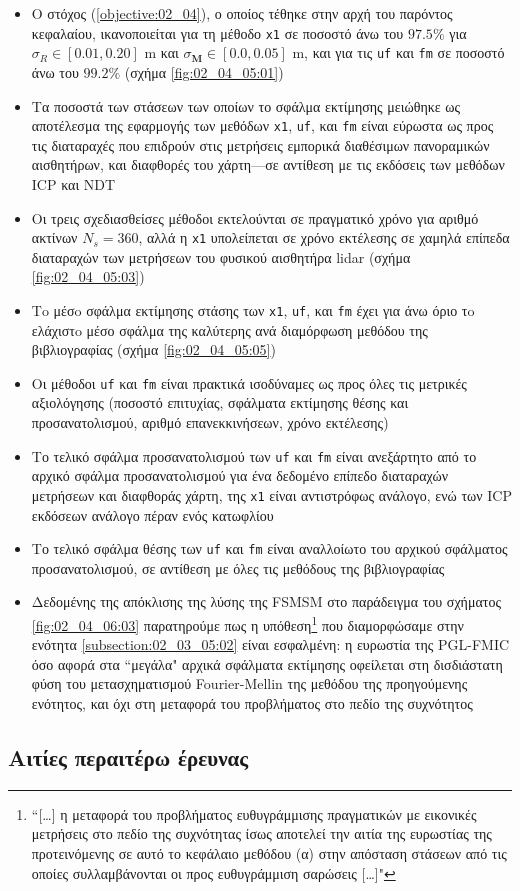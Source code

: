\begin{itemize}
  \item Ο στόχος (\ref{objective:02_04}), ο οποίος τέθηκε στην αρχή του παρόντος
        κεφαλαίου, ικανοποιείται για τη μέθοδο \texttt{x1} σε ποσοστό άνω του
        $97.5\%$ για $\sigma_R \in [0.01, 0.20]$ m και
        $\sigma_{\bm{M}} \in [0.0, 0.05]$ m, και για τις \texttt{uf} και
        \texttt{fm} σε ποσοστό άνω του $99.2\%$ (σχήμα \ref{fig:02_04_05:01})
  \item Τα ποσοστά των στάσεων των οποίων το σφάλμα εκτίμησης μειώθηκε ως
        αποτέλεσμα της εφαρμογής των μεθόδων \texttt{x1}, \texttt{uf}, και
        \texttt{fm} είναι εύρωστα ως προς τις διαταραχές που επιδρούν στις
        μετρήσεις εμπορικά διαθέσιμων πανοραμικών αισθητήρων, και διαφθορές του
        χάρτη---σε αντίθεση με τις εκδόσεις των μεθόδων ICP και NDT
  \item Οι τρεις σχεδιασθείσες μέθοδοι εκτελούνται σε πραγματικό χρόνο για
        αριθμό ακτίνων $N_s = 360$, αλλά η \texttt{x1} υπολείπεται σε χρόνο
        εκτέλεσης σε χαμηλά επίπεδα διαταραχών των μετρήσεων του φυσικού
        αισθητήρα lidar (σχήμα \ref{fig:02_04_05:03})
  \item Τo μέσo σφάλμα εκτίμησης στάσης των \texttt{x1}, \texttt{uf}, και
        \texttt{fm} έχει για άνω όριο τo ελάχιστo μέσο σφάλμα της καλύτερης
        ανά διαμόρφωση μεθόδου της βιβλιογραφίας (σχήμα \ref{fig:02_04_05:05})
  \item Οι μέθοδοι \texttt{uf} και \texttt{fm} είναι πρακτικά ισοδύναμες ως προς
        όλες τις μετρικές αξιολόγησης (ποσοστό επιτυχίας, σφάλματα εκτίμησης
        θέσης και προσανατολισμού, αριθμό επανεκκινήσεων, χρόνο εκτέλεσης)
  \item Το τελικό σφάλμα προσανατολισμού των \texttt{uf} και \texttt{fm} είναι
        ανεξάρτητο από το αρχικό σφάλμα προσανατολισμού για ένα δεδομένο επίπεδο
        διαταραχών μετρήσεων και διαφθοράς χάρτη, της \texttt{x1} είναι
        αντιστρόφως ανάλογο, ενώ των ICP εκδόσεων ανάλογο πέραν ενός κατωφλίου
  \item Το τελικό σφάλμα θέσης των \texttt{uf} και \texttt{fm} είναι αναλλοίωτο
        του αρχικού σφάλματος προσανατολισμού, σε αντίθεση με όλες τις μεθόδους
        της βιβλιογραφίας
  \item Δεδομένης της απόκλισης της λύσης της FSMSM στο παράδειγμα του σχήματος
        \ref{fig:02_04_06:03} παρατηρούμε πως η υπόθεση\footnote{``[\dots] η
        μεταφορά του προβλήματος ευθυγράμμισης πραγματικών με εικονικές
        μετρήσεις στο πεδίο της συχνότητας ίσως αποτελεί την αιτία της
        ευρωστίας της προτεινόμενης σε αυτό το κεφάλαιο μεθόδου (α) στην
        απόσταση στάσεων από τις οποίες συλλαμβάνονται οι προς ευθυγράμμιση
        σαρώσεις [\dots]"} που διαμορφώσαμε στην ενότητα
        \ref{subsection:02_03_05:02} είναι εσφαλμένη: η ευρωστία της PGL-FMIC
        όσο αφορά στα ``μεγάλα" αρχικά σφάλματα εκτίμησης οφείλεται στη
        δισδιάστατη φύση του μετασχηματισμού Fourier-Mellin της μεθόδου της
        προηγούμενης ενότητος, και όχι στη μεταφορά του προβλήματος στο πεδίο
        της συχνότητος
\end{itemize}


\subsection{Αιτίες περαιτέρω έρευνας}
\label{subsection:02_04_07:02}
